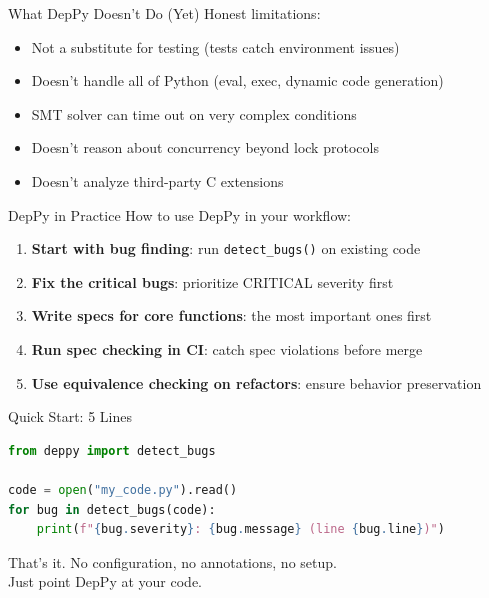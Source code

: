 \documentclass[aspectratio=169,10pt]{beamer}
\begin{document}
\begin{frame}{What DepPy Doesn't Do (Yet)}
Honest limitations:
\vspace{0.3em}
\begin{itemize}
  \item Not a substitute for testing (tests catch environment issues)
  \item Doesn't handle all of Python (eval, exec, dynamic code generation)
  \item SMT solver can time out on very complex conditions
  \item Doesn't reason about concurrency beyond lock protocols
  \item Doesn't analyze third-party C extensions
\end{itemize}
\end{frame}

\begin{frame}{DepPy in Practice}
How to use DepPy in your workflow:
\vspace{0.3em}
\begin{enumerate}
  \item \textbf{Start with bug finding}: run \texttt{detect\_bugs()} on existing code
  \item \textbf{Fix the critical bugs}: prioritize CRITICAL severity first
  \item \textbf{Write specs for core functions}: the most important ones first
  \item \textbf{Run spec checking in CI}: catch spec violations before merge
  \item \textbf{Use equivalence checking on refactors}: ensure behavior preservation
\end{enumerate}
\end{frame}

\begin{frame}[fragile]{Quick Start: 5 Lines}
\begin{lstlisting}[language=Python, basicstyle=\ttfamily\scriptsize]
from deppy import detect_bugs

code = open("my_code.py").read()
for bug in detect_bugs(code):
    print(f"{bug.severity}: {bug.message} (line {bug.line})")
\end{lstlisting}
\vspace{0.5em}
That's it. No configuration, no annotations, no setup.\\
Just point DepPy at your code.
\end{frame}
\end{document}
